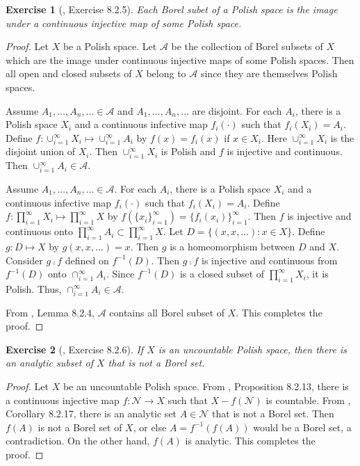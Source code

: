 \documentclass[11pt]{article}
\theoremstyle{plain}
\newtheorem{exercise}{Exercise}
\theoremstyle{definition}
\theoremstyle{remark}
\begin{document}
\begin{exercise}[\cite{book:992991}, Exercise 8.2.5]
    Each Borel subet of a Polish space is the image under a continuous injective map of some Polish space.
\end{exercise}
\begin{proof}
    Let $X$ be a Polish space.
    Let $\mathcal A$ be the collection of Borel subsets of $X$ which are the image under continuous injective maps of some Polish spaces.
    Then all open and closed subsets of $X$ belong to $\mathcal A$ since they are themselves Polish spaces.

    Assume $A_1,\dots,A_n,\dots \in \mathcal A$ and $A_1,\dots,A_n,\dots$ are disjoint.
    For each $A_i$, there is a Polish space $X_i$ and a continuous infective map $f_i(\cdot)$ such that $f_i(X_i)=A_i$.
    Define $f: \cup_{i=1}^{\infty} X_i \mapsto  \cup_{i=1}^{\infty} A_i $ by $f(x)=f_i(x)$ if $x\in X_i$.
    Here $\cup_{i=1}^{\infty} X_i$ is the disjoint union of $X_i$.
    Then $\cup_{i=1}^{\infty} X_i$ is Polish and $f$ is injective and continuous.
    Then $\cup_{i=1}^{\infty} A_i \in \mathcal A$.

    Assume $A_1,\dots,A_n,\dots \in \mathcal A$.
    For each $A_i$, there is a Polish space $X_i$ and a continuous infective map $f_i(\cdot)$ such that $f_i(X_i)=A_i$.
    Define $f: \prod_{i=1}^{\infty} X_i \mapsto  \prod_{i=1}^{\infty} X $ by $f(\{x_i\}_{i=1}^\infty)=\{f_i(x_i)\}_{i=1}^\infty$.
    Then  $f$ is injective and continuous onto $\prod_{i=1}^{\infty} A_i \subset \prod_{i=1}^\infty X$.
    Let $D = \{(x,x,\dots): x\in  X \}$.
    Define $g:D \mapsto X$ by $g(x,x,\dots) = x$.
    Then $g$ is a homeomorphism between $D$ and $X$.
    Consider $g \comp f$ defined on $f^{-1}(D)$.
    Then $g \comp f$ is injective and continuous from $f^{-1}(D)$ onto $\cap_{i=1}^\infty A_i$.
    Since $f^{-1}(D)$ is a closed subset of $\prod_{i=1}^\infty X_i$, it is Polish.
    Thus, $\cap_{i=1}^\infty A_i \in \mathcal A$.

    From \cite{book:992991}, Lemma 8.2.4, $\mathcal A$ contains all Borel subset of $X$.
    This completes the proof.
\end{proof}

\begin{exercise}[\cite{book:992991}, Exercise 8.2.6]
    If $X$ is an uncountable Polish space, then there is an analytic subset of $X$ that is not a Borel set.
\end{exercise}
\begin{proof}
    Let $X$ be an uncountable Polish space.
    From \cite{book:992991}, Proposition 8.2.13, there is a continuous injective map $f: \mathscr N \to X$ such that $X - f(\mathscr N)$ is countable.
    From \cite{book:992991}, Corollary 8.2.17, there is an analytic set $A \in \mathscr N$ that is not a Borel set.
    Then $f(A)$ is not a Borel set of $X$, or else $A= f^{-1}(f(A))$ would be a Borel set, a contradiction.
    On the other hand, $f(A)$ is analytic.
    This completes the proof.
    
\end{proof}
\end{document}
